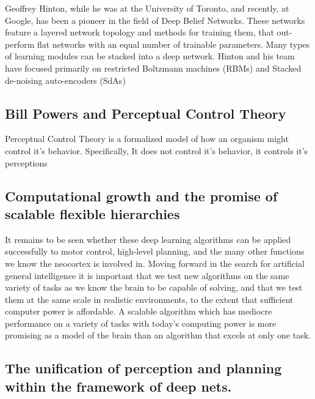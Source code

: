 \documentclass[12pt]{article}
\begin{document}
Geoffrey Hinton, while he was at the University of Toronto, and recently, at Google, has been a pioneer in the field of Deep Belief Networks. These networks feature a layered network topology and methods for training them, that out-perform flat networks with an equal number of trainable parameters. Many types of learning modules can be stacked into a deep network. Hinton and his team have focused primarily on restricted Boltzmann machines (RBMs) and Stacked de-noising auto-encoders (SdAs)

	\subsection{Bill Powers and Perceptual Control Theory}

Perceptual Control Theory is a formalized model of how an organism might control it's behavior. Specifically, It does not control it's behavior, it controls it's perceptions

	\subsection{Computational growth and the promise of scalable flexible hierarchies}
	
It remains to be seen whether these deep learning algorithms can be applied successfully to motor control, high-level planning, and the many other functions we know the neocortex is involved in. Moving forward in the search for artificial general intelligence it is important that we test new algorithms on the same variety of tasks as we know the brain to be capable of solving, and that we test them at the same scale in realistic environments, to the extent that sufficient computer power is affordable. A scalable algorithm which has mediocre performance on a variety of tasks with today's computing power is more promising as a model of the brain than an algorithm that excels at only one task.
	
	\subsection{The unification of perception and planning within the framework of deep nets.}
	\label{fart}
\end{document}

